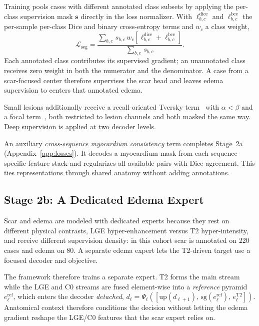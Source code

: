 \documentclass[runningheads]{llncs}
\newcommand{\TT}{\mathrm{T2}}
\newcommand{\sg}{\mathrm{sg}}
\begin{document}
Training pools cases with different annotated class subsets by applying the
per-class supervision mask $\mathbf{s}$ directly in the loss normalizer. With $\ell^{\text{dice}}_{b,c}$ and
$\ell^{\text{bce}}_{b,c}$ the per-sample per-class Dice and binary
cross-entropy terms and $w_c$ a class weight,
\begin{equation}
\mathcal{L}_{\text{seg}}
=\frac{\sum_{b,c}\,s_{b,c}\,w_c\left[\ell^{\text{dice}}_{b,c}+\ell^{\text{bce}}_{b,c}\right]}
       {\sum_{b,c}\,s_{b,c}} .
\label{eq:masked}
\end{equation}
Each annotated class contributes its supervised gradient; an unannotated class
receives zero weight in both the numerator and the denominator. A case from a
scar-focused center therefore supervises the scar head and leaves edema
supervision to centers that annotated edema.

Small lesions additionally receive a recall-oriented Tversky
term~\cite{salehi2017tversky} with $\alpha<\beta$ and a focal
term~\cite{lin2017focal}, both restricted to lesion channels and both masked the
same way. Deep supervision is applied at two decoder levels.

An auxiliary \emph{cross-sequence myocardium consistency} term completes
Stage~2a (Appendix~\ref{app:losses}). It decodes a myocardium mask from each
sequence-specific feature stack and regularizes all available pairs with Dice
agreement. This ties representations through shared anatomy without adding
annotations.

\subsection{Stage 2b: A Dedicated Edema Expert}

Scar and edema are modeled with dedicated experts because they rest on different
physical contrasts, LGE hyper-enhancement versus T2 hyper-intensity, and receive
different supervision density: in this cohort scar is annotated on 220 cases and
edema on 80. A separate edema expert lets the T2-driven target use a focused
decoder and objective.

The framework therefore trains a separate expert. T2 forms the main stream while the
LGE and C0 streams are fused element-wise into a \emph{reference} pyramid
$e^{\text{ref}}_\ell$, which enters the decoder \emph{detached},
$d_\ell=\Psi_\ell([\mathrm{up}(d_{\ell+1}),\,\sg(e^{\text{ref}}_\ell),\,e^{\TT}_\ell])$.
Anatomical context therefore conditions the decision without letting the edema
gradient reshape the LGE/C0 features that the scar expert relies on.
\end{document}
